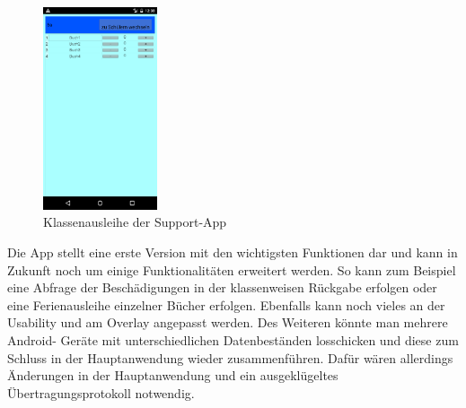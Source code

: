 \begin{figure}[H]
	\centering
		\includegraphics[width=0.30\textwidth]{figures/SupportApp/Klassenausleihe.png}
	\caption{Klassenausleihe der Support-App}
	\label{fig:Klassenausleihe App}
\end{figure}

Die App stellt eine erste Version mit den wichtigsten Funktionen dar und kann in Zukunft noch um einige Funktionalitäten erweitert werden. So kann zum Beispiel eine Abfrage der Beschädigungen in der klassenweisen Rückgabe erfolgen oder eine Ferienausleihe einzelner Bücher erfolgen. Ebenfalls kann noch vieles an der Usability und am Overlay angepasst werden. Des Weiteren könnte man mehrere Android- Geräte mit unterschiedlichen Datenbeständen losschicken und diese zum Schluss in der Hauptanwendung wieder zusammenführen. Dafür wären allerdings Änderungen in der Hauptanwendung und ein ausgeklügeltes Übertragungsprotokoll notwendig.